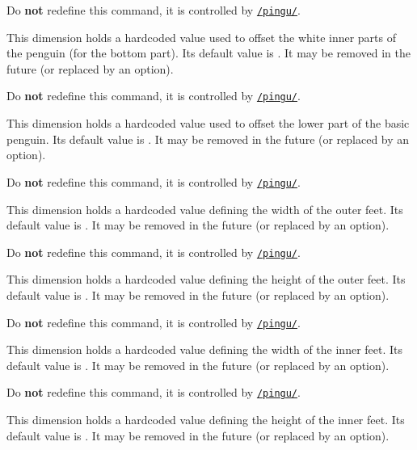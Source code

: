\documentclass[parskip=half,english,numbers=noenddot,footnotes=nomultiple,oneside]{scrartcl}
\makeatletter
\def\lpingu#1{\lstinline[style=lstpingu,language=pingulang]'#1'}
\let\@explainsuff\@empty
\let\@labelhack\@empty
\newcommand*\keyref[2][/pingu/]{\hyperref[pk:#1#2]{\lpingu{#1#2}}}
\newenvironment{commandexplain}[3][]{%
\begingroup
\def\@labelhack{/pingu/}%
\def\mand##1{\texttt{\{\textsf{\smaller##1}\}}}%
\def\@pingu@command@keypartner{#1}%
\newcommand\opt[2][]{\texttt{\textit{[\textsf{\smaller##2\ifx!##1!\else\textcolor{gray}{\smaller\sffamily=##1}\fi}]}}}%
\def\@explainsuff{#3}%
\keyexplain[]{\\#2}{}{}%
\ifx\@pingu@command@keypartner\@empty\else
{\@declaredcolor{gray}\footnotesize Do \textbf{not} redefine this command, it is controlled by \keyref{#1}.}\par\fi
}{\endkeyexplain\endgroup}
\makeatother
\begin{document}
\begin{commandexplain}{pingu@lower@off}{}
	This dimension holds a hardcoded value used to offset the white inner parts of the penguin (for the bottom part). Its default value is \the\pingu@lower@off. It may be removed in the future (or replaced by an option).
\end{commandexplain}

\begin{commandexplain}{pingu@outer@off}{}
	This dimension holds a hardcoded value used to offset the lower part of the basic penguin. Its default value is \the\pingu@outer@off. It may be removed in the future (or replaced by an option).
\end{commandexplain}

\begin{commandexplain}{pingu@foot@outer@w}{}
	This dimension holds a hardcoded value defining the width of the outer feet. Its default value is \the\pingu@foot@outer@w. It may be removed in the future (or replaced by an option).
\end{commandexplain}

\begin{commandexplain}{pingu@foot@outer@h}{}
	This dimension holds a hardcoded value defining the height of the outer feet. Its default value is \the\pingu@foot@outer@h. It may be removed in the future (or replaced by an option).
\end{commandexplain}

\begin{commandexplain}{pingu@foot@inner@w}{}
	This dimension holds a hardcoded value defining the width of the inner feet. Its default value is \the\pingu@foot@inner@w. It may be removed in the future (or replaced by an option).
\end{commandexplain}

\begin{commandexplain}{pingu@foot@inner@h}{}
	This dimension holds a hardcoded value defining the height of the inner feet. Its default value is \the\pingu@foot@inner@h. It may be removed in the future (or replaced by an option).
\end{commandexplain}

\end{document}
